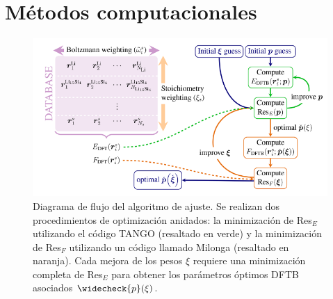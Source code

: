 \section{Métodos computacionales}

\begin{figure}[h!]
    \centering
    \includegraphics[width=\textwidth]{Silicio/modelo/metodos/diagrama.png}
    \caption{Diagrama de flujo del algoritmo de ajuste. Se realizan dos 
    procedimientos de optimización anidados: la minimización de Res$_E$ utilizando 
    el código TANGO \cite{tango} (resaltado en verde) y la minimización de Res$_F$
    utilizando un código llamado Milonga (resaltado en naranja). Cada mejora de 
    los pesos $\xi$ requiere una minimización completa de Res$_E$ para obtener 
    los parámetros óptimos DFTB asociados $\widecheck{p}(\xi)$.}
    \label{fig:diagrama}
\end{figure}
